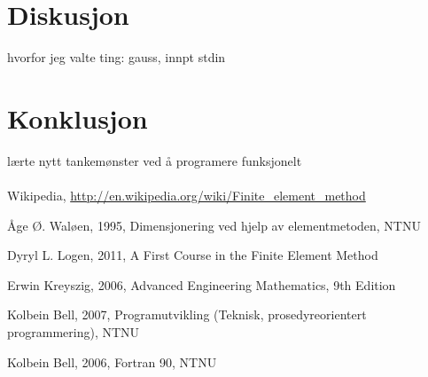 \documentclass[10pt,a4paper, norsk]{article}
\begin{document}
\section{Diskusjon}

hvorfor jeg valte ting: gauss, innpt stdin

\section{Konklusjon}

lærte nytt tankemønster ved å programere funksjonelt

\paragraph{} 


\begin{thebibliography}{9}

  Wikipedia,
  \url{http://en.wikipedia.org/wiki/Finite_element_method}
  

  Åge Ø. Waløen,
  1995, 
  Dimensjonering ved hjelp av elementmetoden, NTNU
 
	Dyryl L. Logen, 2011, A First Course in the Finite Element Method
	
Erwin Kreyszig, 2006, Advanced Engineering Mathematics, 9th Edition

Kolbein Bell, 2007, Programutvikling (Teknisk, prosedyreorientert programmering), NTNU

Kolbein Bell, 2006, Fortran 90, NTNU

\end{thebibliography}
\end{document}
